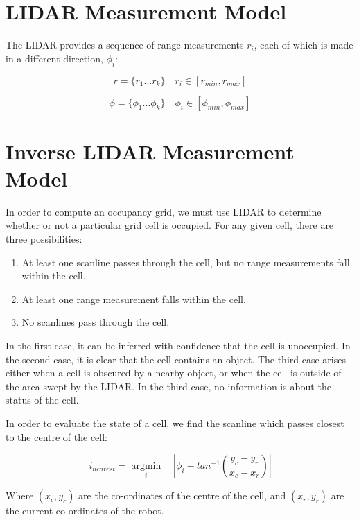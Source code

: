 \documentclass[11pt]{article} %
\begin{document}
\section{LIDAR Measurement Model}
The LIDAR provides a sequence of range measurements $r_i$, each of which is made in a different direction, $\phi_i$:

\begin{equation}
r = \{r_1 \dots r_k\} \quad r_i \in [r_{min}, r_{max}]
\end{equation}

\begin{equation}
\phi = \{\phi_1 \dots \phi_k\} \quad \phi_i \in [\phi_{min}, \phi_{max}]
\end{equation}

\section{Inverse LIDAR Measurement Model}
In order to compute an occupancy grid, we must use LIDAR to determine whether or not a particular grid cell is occupied.  For any given cell, there are three possibilities:

\begin{enumerate}
 \item At least one scanline passes through the cell, but no range measurements fall within the cell.
 \item At least one range measurement falls within the cell.
 \item No scanlines pass through the cell.
\end{enumerate}

In the first case, it can be inferred with confidence that the cell is unoccupied.  
In the second case, it is clear that the cell contains an object.  
The third case arises either when a cell is obscured by a nearby object, or when the cell is outside of the area swept by the LIDAR.  In the third case, no information is about the status of the cell.

In order to evaluate the state of a cell, we find the scanline which passes closest to the centre of the cell:

\begin{equation}
i_{nearest} = \underset{i}{\operatorname{argmin}} \quad | \phi_i - tan^{-1}(\frac{y_c - y_r}{x_c - x_r}) |
\end{equation}

Where $(x_c, y_c)$ are the co-ordinates of the centre of the cell, and $(x_r, y_r)$ are the current co-ordinates of the robot.  
\end{document}
